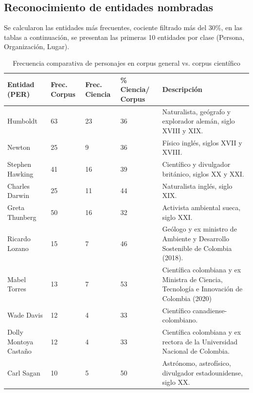 \documentclass[11pt,a4paper]{article}
\begin{document}
	
	
	\subsection{Reconocimiento de entidades nombradas}
	
	Se calcularon las entidades más frecuentes, cociente filtrado más del 30\%, en las tablas a continuación, se presentan las primeras 10 entidades por clase (Persona, Organización, Lugar).\\
	
	

	\begin{table}[H]
		\centering
		\caption{Frecuencia comparativa de personajes en corpus general vs. corpus científico}
		\label{tab:ents_per}
		\footnotesize 

		\begin{tabular}{p{3cm}P{2.2cm}P{2.2cm}P{2.2cm}p{5cm}}
			\toprule
			\textbf{Entidad (PER)} & 
			\textbf{Frec. Corpus} & 
			\textbf{Frec. Ciencia} & 
			\textbf{\% Ciencia/ Corpus} & 
			\textbf{Descripción} \\
			\midrule
			Humboldt & 63 & 23 & 36 & Naturalista, geógrafo y explorador alemán, siglo XVIII y XIX. \\
			Newton & 25 & 9 & 36 & Físico inglés, siglos XVII y XVIII. \\
			Stephen Hawking & 41 & 16 & 39 & Científico y divulgador británico, siglos XX y XXI. \\
			Charles Darwin & 25 & 11 & 44 & Naturalista inglés, siglo XIX. \\
			Greta Thunberg & 50 & 16 & 32 & Activista ambiental sueca, siglo XXI. \\
			Ricardo Lozano & 15 & 7 & 46 & Geólogo y ex ministro de Ambiente y Desarrollo Sostenible de Colombia (2018). \\
			Mabel Torres & 13 & 7 & 53 & Científica colombiana y ex Ministra de Ciencia, Tecnología e Innovación de Colombia (2020) \\
			Wade Davis & 12 & 4 & 33 & Científico canadiense-colombiano. \\
			Dolly Montoya Castaño & 12 & 4 & 33 & Científica colombiana y ex rectora de la Universidad Nacional de Colombia. \\
			Carl Sagan & 10 & 5 & 50 & Astrónomo, astrofísico, divulgador estadounidense, siglo XX.\\
			
			\bottomrule
		\end{tabular}
	\end{table}
	
\end{document}
